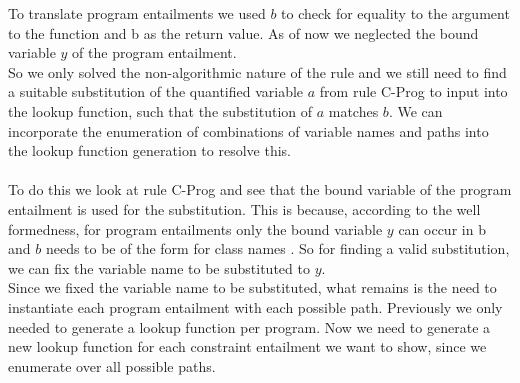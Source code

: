 To translate program entailments 
we used $b$ to check for equality to the argument to the function
and \ovl b as the return value.
As of now we neglected the bound variable $y$ of the program entailment.\\
So we only solved the non-algorithmic nature of the rule
and we still need to find a suitable substitution
of the quantified variable $a$ from rule C-Prog
to input into the lookup function, such that the substitution of $a$ matches $b$.
We can incorporate the enumeration of combinations of variable names and paths
into the lookup function generation to resolve this.\\
\\
To do this we look at rule C-Prog and
see that the bound variable of the program entailment is used
for the substitution.
This is because, according to the well formedness,
for program entailments 
only the bound variable $y$ can occur in \ovl b
and $b$ needs to be of the form 
for class names .
So for finding a valid substitution,
we can fix the variable name to be substituted to $y$.\\
Since we fixed the variable name to be substituted,
what remains is the need to instantiate each program entailment
with each possible path.
Previously we only needed to generate a lookup function per program.
Now we need to generate a new lookup function
for each constraint entailment we want to show,
since we enumerate over all possible paths.

